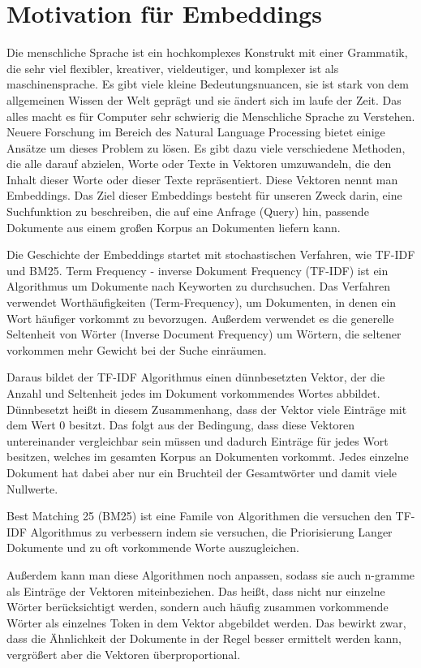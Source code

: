 \section{Motivation für Embeddings}

Die menschliche Sprache ist ein hochkomplexes Konstrukt mit einer Grammatik, die sehr viel flexibler, kreativer, vieldeutiger, und komplexer ist als maschinensprache. 
Es gibt viele kleine Bedeutungsnuancen, sie ist stark von dem allgemeinen Wissen der Welt geprägt und sie ändert sich im laufe der Zeit. 
Das alles macht es für Computer sehr schwierig die Menschliche Sprache zu Verstehen. 
Neuere Forschung im Bereich des Natural Language Processing bietet einige Ansätze um dieses Problem zu lösen. 
Es gibt dazu viele verschiedene Methoden, die alle darauf abzielen, Worte oder Texte in Vektoren umzuwandeln, die den Inhalt dieser Worte oder dieser Texte repräsentiert.
Diese Vektoren nennt man Embeddings.
Das Ziel dieser Embeddings besteht für unseren Zweck darin, eine Suchfunktion zu beschreiben, die auf eine Anfrage (Query) hin, passende Dokumente aus einem großen Korpus an Dokumenten liefern kann.

Die Geschichte der Embeddings startet mit stochastischen Verfahren, wie TF-IDF und BM25. 
Term Frequency - inverse Dokument Frequency (TF-IDF) ist ein Algorithmus um Dokumente nach Keyworten zu durchsuchen.
Das Verfahren verwendet Worthäufigkeiten (Term-Frequency), um Dokumenten, in denen ein Wort häufiger vorkommt zu bevorzugen.
Außerdem verwendet es die generelle Seltenheit von Wörter (Inverse Document Frequency) um Wörtern, die seltener vorkommen mehr Gewicht bei der Suche einräumen.

Daraus bildet der TF-IDF Algorithmus einen dünnbesetzten Vektor, der die Anzahl und Seltenheit jedes im Dokument vorkommendes Wortes abbildet. 
Dünnbesetzt heißt in diesem Zusammenhang, dass der Vektor viele Einträge mit dem Wert 0 besitzt. 
Das folgt aus der Bedingung, dass diese Vektoren untereinander vergleichbar sein müssen und dadurch Einträge für jedes Wort besitzen, welches im gesamten Korpus an Dokumenten vorkommt.
Jedes einzelne Dokument hat dabei aber nur ein Bruchteil der Gesamtwörter und damit viele Nullwerte.

Best Matching 25 (BM25) ist eine Famile von Algorithmen die versuchen den TF-IDF Algorithmus zu verbessern indem sie versuchen, die Priorisierung Langer Dokumente und zu oft vorkommende Worte auszugleichen.

Außerdem kann man diese Algorithmen noch anpassen, sodass sie auch n-gramme als Einträge der Vektoren miteinbeziehen. 
Das heißt, dass nicht nur einzelne Wörter berücksichtigt werden, sondern auch häufig zusammen vorkommende Wörter als einzelnes Token in dem Vektor abgebildet werden. 
Das bewirkt zwar, dass die Ähnlichkeit der Dokumente in der Regel besser ermittelt werden kann, vergrößert aber die Vektoren überproportional.

